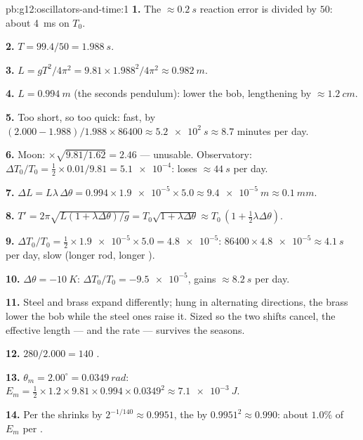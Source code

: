 \begin{solution}{pb:g12:oscillators-and-time:1}
\textbf{1.} The $\approx \qty{0.2}{s}$ reaction error is divided by
$50$: about \qty{4}{ms} on $T_0$.

\textbf{2.} $T = 99.4/50 = \qty{1.988}{s}$.

\textbf{3.} $L = gT^2/4\pi^2 = 9.81 \times 1.988^2/4\pi^2 \approx
\qty{0.982}{m}$.

\textbf{4.} $L = \qty{0.994}{m}$ (the seconds pendulum): lower the
bob, lengthening by $\approx \qty{1.2}{cm}$.

\textbf{5.} Too short, so too quick: fast, by $(2.000 -
1.988)/1.988 \times 86400 \approx \qty{5.2e2}{s} \approx 8.7$
minutes per day.

\textbf{6.} Moon: $\times\sqrt{9.81/1.62} = 2.46$ --- unusable.
Observatory: $\Delta T_0/T_0 = \tfrac12 \times 0.01/9.81 =
\num{5.1e-4}$: loses $\approx \qty{44}{s}$ per day.

\textbf{7.} $\Delta L = L\lambda\,\Delta\theta = 0.994 \times
\num{1.9e-5} \times 5.0 \approx \qty{9.4e-5}{m} \approx
\qty{0.1}{mm}$.

\textbf{8.} $T' = 2\pi\sqrt{L(1 + \lambda\Delta\theta)/g} =
T_0\sqrt{1 + \lambda\Delta\theta} \approx T_0\,(1 + \tfrac12
\lambda\Delta\theta)$.

\textbf{9.} $\Delta T_0/T_0 = \tfrac12 \times \num{1.9e-5} \times
5.0 = \num{4.8e-5}$: $86400 \times \num{4.8e-5} \approx
\qty{4.1}{s}$ per day, slow (longer rod, longer ).

\textbf{10.} $\Delta\theta = \qty{-10}{K}$: $\Delta T_0/T_0 =
\num{-9.5e-5}$, gains $\approx \qty{8.2}{s}$ per day.

\textbf{11.} Steel and brass expand differently; hung in alternating
directions, the brass  lower the bob while the steel ones raise
it. Sized so the two shifts cancel, the effective length --- and the
rate --- survives the seasons.

\textbf{12.} $280/2.000 = 140$ .

\textbf{13.} $\theta_m = 2.00^\circ = \qty{0.0349}{rad}$: $E_m =
\tfrac12 \times 1.2 \times 9.81 \times 0.994 \times 0.0349^2 \approx
\qty{7.1e-3}{J}$.

\textbf{14.} Per  the  shrinks by $2^{-1/140} \approx
0.9951$, the  by $0.9951^2 \approx 0.990$: about $1.0\%$ of
$E_m$ per .


\end{solution}

